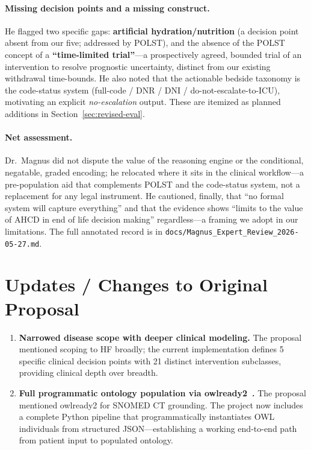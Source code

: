 \documentclass[11pt]{article}
\begin{document}
\paragraph{Missing decision points and a missing construct.}
He flagged two specific gaps: \textbf{artificial hydration/nutrition} (a decision point absent from our five; addressed by POLST), and the absence of the POLST concept of a \textbf{``time-limited trial''}---a prospectively agreed, bounded trial of an intervention to resolve prognostic uncertainty, distinct from our existing withdrawal time-bounds. He also noted that the actionable bedside taxonomy is the code-status system (full-code / DNR / DNI / do-not-escalate-to-ICU), motivating an explicit \emph{no-escalation} output. These are itemized as planned additions in Section~\ref{sec:revised-eval}.

\paragraph{Net assessment.}
Dr.\ Magnus did not dispute the value of the reasoning engine or the conditional, negatable, graded encoding; he relocated where it sits in the clinical workflow---a pre-population aid that complements POLST and the code-status system, not a replacement for any legal instrument. He cautioned, finally, that ``no formal system will capture everything'' and that the evidence shows ``limits to the value of AHCD in end of life decision making'' regardless---a framing we adopt in our limitations. The full annotated record is in \texttt{docs/Magnus\_Expert\_Review\_2026-05-27.md}.

\section{Updates / Changes to Original Proposal}

\begin{enumerate}
    \item \textbf{Narrowed disease scope with deeper clinical modeling.} The proposal mentioned scoping to HF broadly; the current implementation defines 5 specific clinical decision points with 21 distinct intervention subclasses, providing clinical depth over breadth.

    \item \textbf{Full programmatic ontology population via owlready2~\cite{owlready2}.} The proposal mentioned owlready2 for SNOMED CT grounding. The project now includes a complete Python pipeline that programmatically instantiates OWL individuals from structured JSON---establishing a working end-to-end path from patient input to populated ontology.
\end{enumerate}
\end{document}
